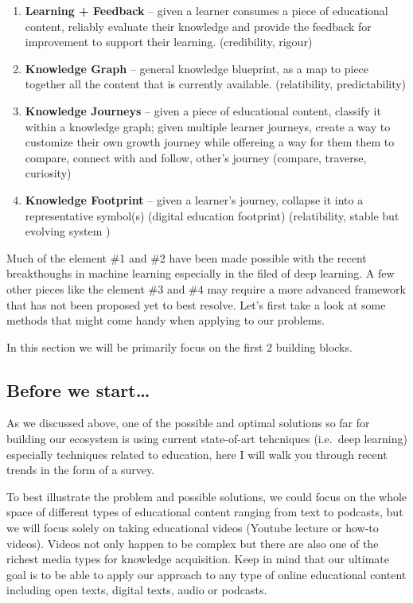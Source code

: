\documentclass[]{book}
\theoremstyle{definition}
\theoremstyle{definition}
\theoremstyle{definition}
\theoremstyle{remark}
\begin{document}
\begin{enumerate}
\def\labelenumi{\arabic{enumi}.}
\item
  \textbf{Learning + Feedback} -- given a learner consumes a piece of
  educational content, reliably evaluate their knowledge and provide the
  feedback for improvement to support their learning. (credibility,
  rigour)
\item
  \textbf{Knowledge Graph} -- general knowledge blueprint, as a map to
  piece together all the content that is currently available.
  (relatibility, predictability)
\item
  \textbf{Knowledge Journeys} -- given a piece of educational content,
  classify it within a knowledge graph; given multiple learner journeys,
  create a way to customize their own growth journey while offereing a
  way for them them to compare, connect with and follow, other's journey
  (compare, traverse, curiosity)
\item
  \textbf{Knowledge Footprint} -- given a learner's journey, collapse it
  into a representative symbol(s) (digital education footprint)
  (relatibility, stable but evolving system )
\end{enumerate}

Much of the element \#1 and \#2 have been made possible with the recent
breakthoughs in machine learning especially in the filed of deep
learning. A few other pieces like the element \#3 and \#4 may require a
more advanced framework that has not been proposed yet to best resolve.
Let's first take a look at some methods that might come handy when
applying to our problems.

In this section we will be primarily focus on the first 2 building
blocks.

\subsection{Before we start\ldots{}}\label{before-we-start}

As we discussed above, one of the possible and optimal solutions so far
for building our ecosystem is using current state-of-art tehcniques
(i.e.~deep learning) especially techniques related to education, here I
will walk you through recent trends in the form of a survey.

To best illustrate the problem and possible solutions, we could focus on
the whole space of different types of educational content ranging from
text to podcasts, but we will focus solely on taking educational videos
(Youtube lecture or how-to videos). Videos not only happen to be complex
but there are also one of the richest media types for knowledge
acquisition. Keep in mind that our ultimate goal is to be able to apply
our approach to any type of online educational content including open
texts, digital texts, audio or podcasts.
\end{document}
